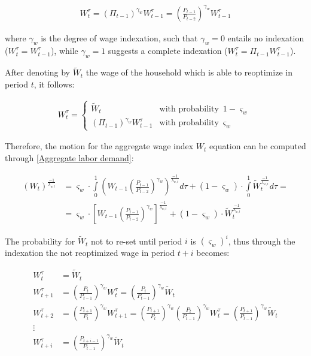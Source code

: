 \documentclass{pracamgr}
\numberwithin{equation}{section}
\begin{document}
\begin{align}
W_{t}^{\tau} = \left( \Pi_{t-1} \right)^{\gamma_{w}}W_{t-1}^{\tau} = \left( \frac{P_{t-1}}{P_{t-2}} \right)^{\gamma_{w}}W_{t-1}^{\tau}
\end{align}

where $\gamma_{w}$ is the degree of wage indexation, such that $\gamma_{w} = 0$ entails no indexation ($W_{t}^{\tau} = W_{t-1}^{\tau}$), while $\gamma_{w} = 1$ suggests a complete indexation ($W_{t}^{\tau} = \Pi_{t-1} W_{t-1}^{\tau}$).

After denoting by $\widetilde{W}_{t}$ the wage of the household which is able to reoptimize in period $t$, it follows:

\begin{align}
W_{t}^{\tau} = \begin{cases}
\widetilde{W}_{t} & \text{with probability} \enspace 1-\varsigma_{w} \\
\left( \Pi_{t-1} \right)^{\gamma_{w}}W_{t-1}^{\tau} & \text{with probability} \enspace \varsigma_{w} 
\end{cases}
\end{align}

Therefore, the motion for the aggregate wage index $W_{t}$ equation can be computed through \ref{Aggregate labor demand}:

\begin{align}
\left(W_{t}\right)^{\frac{-1}{\lambda_{w,t}}} &= \varsigma_{w} \cdot \int\limits_{0}^{1} \left( W_{t-1}\left( \frac{P_{t-1}}{P_{t-2}} \right)^{\gamma_{w}} \right)^{\frac{-1}{\lambda_{w,t}}} d\tau + (1 - \varsigma_{w}) \cdot \int\limits_{0}^{1} \widetilde{W}_{t}^{\frac{-1}{\lambda_{w,t}}} d\tau = \nonumber \\ 
& = \varsigma_{w}\cdot \left[ W_{t-1}\left( \frac{P_{t-1}}{P_{t-2}} \right)^{\gamma_{w}} \right]^{\frac{-1}{\lambda_{w,t}}} + (1 - \varsigma_{w}) \cdot \widetilde{W}_{t}^{\frac{-1}{\lambda_{w,t}}}
\end{align}

The probability for $\widetilde{W}_{t}$ not to re-set until period $i$ is $\left( \varsigma_{w} \right)^{i}$, thus through the indexation the not reoptimized wage in period $t+i$ becomes:

\begin{align}
W_{t}^{\tau} &= \widetilde{W}_{t} \nonumber \\
W_{t+1}^{\tau} &= \left( \frac{P_{t}}{P_{t-1}} \right)^{\gamma_{w}} W_{t}^{\tau} = \left( \frac{P_{t}}{P_{t-1}} \right)^{\gamma_{w}} \widetilde{W}_{t}  \nonumber \\
W_{t+2}^{\tau} &= \left( \frac{P_{t+1}}{P_{t}} \right)^{\gamma_{w}}  W_{t+1}^{\tau} = \left( \frac{P_{t+1}}{P_{t}} \right)^{\gamma_{w}} \left( \frac{P_{t}}{P_{t-1}} \right)^{\gamma_{w}}  W_{t}^{\tau}  = \left( \frac{P_{t+1}}{P_{t-1}} \right)^{\gamma_{w}} \widetilde{W}_{t} \nonumber \\ \vdots \nonumber \\
W_{t+i}^{\tau} &= \left( \frac{P_{t+i-1}}{P_{t-1}} \right)^{\gamma_{w}} \widetilde{W}_{t} \nonumber \\
\end{align}
\end{document}
